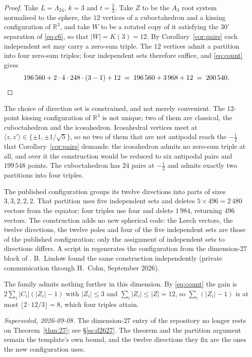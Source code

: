 \documentclass[11pt]{amsart}
\theoremstyle{remark}
\newcommand{\Leech}{\Lambda_{24}}
\newcommand{\ip}[2]{\langle #1,#2\rangle}
\newcommand{\R}{\mathbb{R}}
\begin{document}
\begin{proof}
Take $L=\Leech$, $k=3$ and $t=\tfrac23$. Take $Z$ to be the $A_3$ root system
normalised to the sphere, the $12$ vertices of a cuboctahedron and a kissing
configuration of $\R^3$, and take $W$ to be a rotated copy of it satisfying the
$30^\circ$ separation of \eqref{eq:c6}, so that $|W|=K(3)=12$. By
Corollary~\ref{cor:pairs} each independent set may carry a zero-sum triple. The
$12$ vertices admit a partition into four zero-sum triples; four independent sets
therefore suffice, and \eqref{eq:count} gives
\[
  196\,560+2\cdot 4\cdot 248\cdot(3-1)+12
  \;=\;196\,560+3\,968+12\;=\;200\,540 . \qedhere
\]
\end{proof}

The choice of direction set is constrained, and not merely convenient. The
$12$-point kissing configuration of $\R^3$ is not unique; two of them are classical,
the cuboctahedron and the icosahedron. Icosahedral vertices meet at
$\ip{z}{z'}\in\{\pm1,\pm1/\sqrt5\}$, so
no two of them that are not antipodal reach the $-\tfrac12$ that
Corollary~\ref{cor:pairs} demands: the icosahedron admits no zero-sum triple at
all, and over it the construction would be reduced to six antipodal pairs and
$199\,548$ points. The cuboctahedron has $24$ pairs at $-\tfrac12$ and admits
exactly two partitions into four triples.

The published configuration \cite{ma-etal2025} groups its twelve directions into
parts of sizes $3,3,2,2,2$. That partition uses five independent sets and deletes
$5\times496=2\,480$ vectors from the equator; four triples use four and delete
$1\,984$, returning $496$ vectors. The construction adds no new spherical code:
the Leech vectors, the twelve directions, the twelve poles and four of the five
independent sets are those of the published configuration; only the
assignment of independent sets to directions differs. A script in \cite{repo}
regenerates the configuration from the dimension-$27$ block of \cite{cohn-data}.
B.~Lindow found the same construction independently (private communication
through H.~Cohn, September 2026).

The family admits nothing further in this dimension. By \eqref{eq:count} the gain
is $2\sum_i|C_i|(|Z_i|-1)$ with $|Z_i|\le3$ and $\sum_i|Z_i|\le|Z|=12$, so
$\sum_i(|Z_i|-1)$ is at most $\lfloor 2\cdot12/3\rfloor=8$, which four triples
attain.

\emph{Superseded, 2026-09-08.} The dimension-$27$ entry of the repository no
longer rests on Theorem~\ref{thm:27}; see \S\ref{ss:d2627}. The theorem and
the partition argument remain the template's own bound, and the twelve
directions they fix are the ones the new configuration uses.
\end{document}
